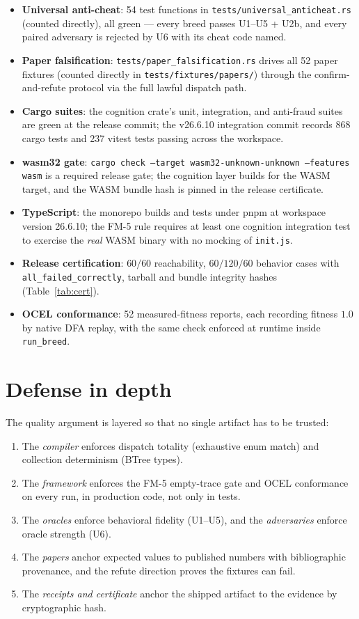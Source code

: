 \documentclass[11pt,oneside]{report}
\newcommand{\projver}{v26.6.10}
\begin{document}
\begin{itemize}
  \item \textbf{Universal anti-cheat}: 54 test functions in
  \texttt{tests/universal\_anticheat.rs} (counted directly), all green ---
  every breed passes U1--U5 + U2b, and every paired adversary is rejected
  by U6 with its cheat code named.
  \item \textbf{Paper falsification}: \texttt{tests/paper\_falsification.rs}
  drives all 52 paper fixtures (counted directly in
  \texttt{tests/fixtures/papers/}) through the confirm-and-refute
  protocol via the full lawful dispatch path.
  \item \textbf{Cargo suites}: the cognition crate's unit, integration,
  and anti-fraud suites are green at the release commit; the \projver{}
  integration commit records 868 cargo tests and 237 vitest tests passing
  across the workspace.
  \item \textbf{wasm32 gate}: \texttt{cargo check --target
  wasm32-unknown-unknown --features wasm} is a required release gate; the
  cognition layer builds for the WASM target, and the WASM bundle hash is
  pinned in the release certificate.
  \item \textbf{TypeScript}: the monorepo builds and tests under pnpm at
  workspace version 26.6.10; the FM-5 rule requires at least one
  cognition integration test to exercise the \emph{real} WASM binary with
  no mocking of \texttt{init.js}.
  \item \textbf{Release certification}: $60/60$ reachability,
  $60/120/60$ behavior cases with \texttt{all\_failed\_correctly},
  tarball and bundle integrity hashes (Table~\ref{tab:cert}).
  \item \textbf{OCEL conformance}: 52 measured-fitness reports, each
  recording fitness $1.0$ by native DFA replay, with the same check
  enforced at runtime inside \texttt{run\_breed}.
\end{itemize}

\section{Defense in depth}

The quality argument is layered so that no single artifact has to be
trusted:

\begin{enumerate}
  \item The \emph{compiler} enforces dispatch totality (exhaustive enum
  match) and collection determinism (BTree types).
  \item The \emph{framework} enforces the FM-5 empty-trace gate and OCEL
  conformance on every run, in production code, not only in tests.
  \item The \emph{oracles} enforce behavioral fidelity (U1--U5), and the
  \emph{adversaries} enforce oracle strength (U6).
  \item The \emph{papers} anchor expected values to published numbers
  with bibliographic provenance, and the refute direction proves the
  fixtures can fail.
  \item The \emph{receipts and certificate} anchor the shipped artifact
  to the evidence by cryptographic hash.
\end{enumerate}
\end{document}
